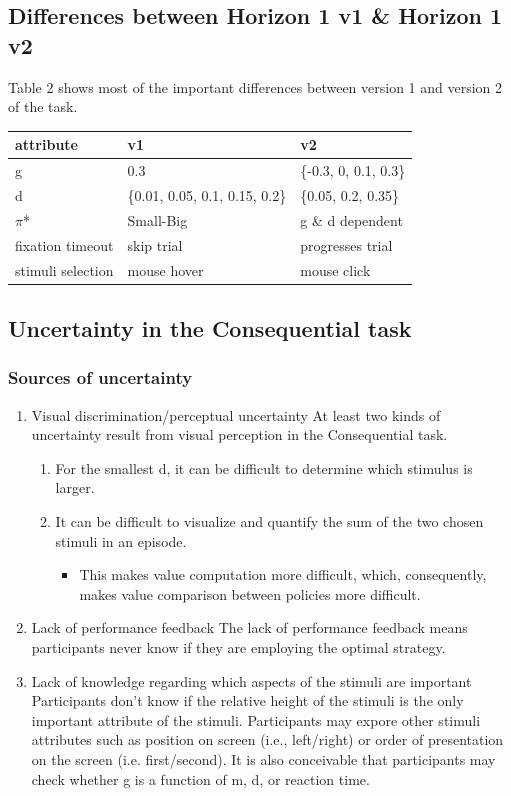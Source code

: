 \documentclass[11pt]{article}
\begin{document}
\subsection{Differences between Horizon 1 v1 \& Horizon 1 v2}
\label{sec:orgc829446}
Table 2 shows most of the important differences between version 1 and version 2 of the task.
\begin{table}[htbp]
\label{Table 2}
\centering
\begin{tabular}{lll}
attribute & v1 & v2\\
\hline
g & 0.3 & \{-0.3, 0, 0.1, 0.3\}\\
d & \{0.01, 0.05, 0.1, 0.15, 0.2\} & \{0.05, 0.2, 0.35\}\\
\(\pi\)* & Small-Big & g \& d dependent\\
fixation timeout & skip trial & progresses trial\\
stimuli selection & mouse hover & mouse click\\
\end{tabular}
\end{table}
\subsection{Uncertainty in the Consequential task}
\label{sec:org091c3ce}
\subsubsection{Sources of uncertainty}
\label{sec:org577c035}
\begin{enumerate}
\item Visual discrimination/perceptual uncertainty
\label{sec:orgf611678}
At least two kinds of uncertainty result from visual perception in the Consequential task.
\begin{enumerate}
\item For the smallest d, it can be difficult to determine which stimulus is larger.
\item It can be difficult to visualize and quantify the sum of the two chosen stimuli in an episode.
\begin{itemize}
\item This makes value computation more difficult, which, consequently, makes value comparison between policies more difficult.
\end{itemize}
\end{enumerate}
\item Lack of performance feedback
\label{sec:orgffcad0d}
The lack of performance feedback means participants never know if they are employing the optimal strategy.
\item Lack of knowledge regarding which aspects of the stimuli are important
\label{sec:orgf028adc}
Participants don't know if the relative height of the stimuli is the only important attribute of the stimuli. Participants may expore other stimuli attributes such as position on screen (i.e., left/right) or order of presentation on the screen (i.e. first/second). It is also conceivable that participants may check whether g is a function of m, d, or reaction time.
\end{enumerate}
\end{document}
